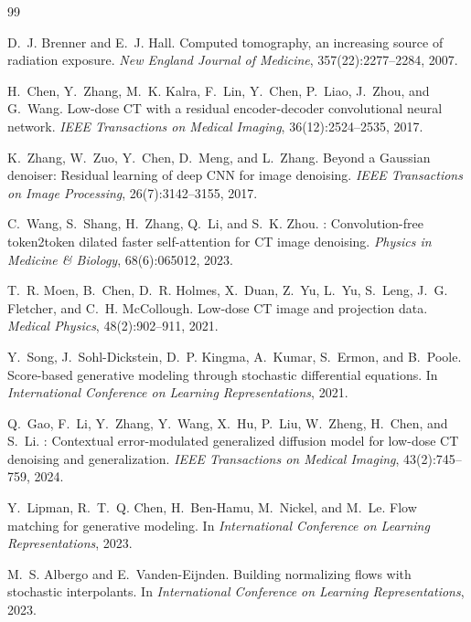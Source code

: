 \documentclass[10pt,twocolumn]{article}
\begin{document}

\begin{thebibliography}{99}

D.~J. Brenner and E.~J. Hall.
\newblock Computed tomography, an increasing source of radiation exposure.
\newblock \emph{New England Journal of Medicine}, 357(22):2277--2284, 2007.

H.~Chen, Y.~Zhang, M.~K. Kalra, F.~Lin, Y.~Chen, P.~Liao, J.~Zhou, and
  G.~Wang.
\newblock Low-dose {CT} with a residual encoder-decoder convolutional neural
  network.
\newblock \emph{IEEE Transactions on Medical Imaging}, 36(12):2524--2535, 2017.

K.~Zhang, W.~Zuo, Y.~Chen, D.~Meng, and L.~Zhang.
\newblock Beyond a {G}aussian denoiser: Residual learning of deep {CNN} for
  image denoising.
\newblock \emph{IEEE Transactions on Image Processing}, 26(7):3142--3155, 2017.

C.~Wang, S.~Shang, H.~Zhang, Q.~Li, and S.~K. Zhou.
: Convolution-free token2token dilated faster self-attention
  for {CT} image denoising.
\newblock \emph{Physics in Medicine \& Biology}, 68(6):065012, 2023.

T.~R. Moen, B.~Chen, D.~R. Holmes, X.~Duan, Z.~Yu, L.~Yu, S.~Leng,
  J.~G. Fletcher, and C.~H. McCollough.
\newblock Low-dose {CT} image and projection data.
\newblock \emph{Medical Physics}, 48(2):902--911, 2021.

Y.~Song, J.~Sohl-Dickstein, D.~P. Kingma, A.~Kumar, S.~Ermon, and B.~Poole.
\newblock Score-based generative modeling through stochastic differential
  equations.
\newblock In \emph{International Conference on Learning Representations}, 2021.

Q.~Gao, F.~Li, Y.~Zhang, Y.~Wang, X.~Hu, P.~Liu, W.~Zheng, H.~Chen, and
  S.~Li.
: Contextual error-modulated generalized diffusion model for
  low-dose {CT} denoising and generalization.
\newblock \emph{IEEE Transactions on Medical Imaging}, 43(2):745--759, 2024.

Y.~Lipman, R.~T.~Q. Chen, H.~Ben-Hamu, M.~Nickel, and M.~Le.
\newblock Flow matching for generative modeling.
\newblock In \emph{International Conference on Learning Representations}, 2023.

M.~S. Albergo and E.~Vanden-Eijnden.
\newblock Building normalizing flows with stochastic interpolants.
\newblock In \emph{International Conference on Learning Representations}, 2023.


\end{thebibliography}
\end{document}
